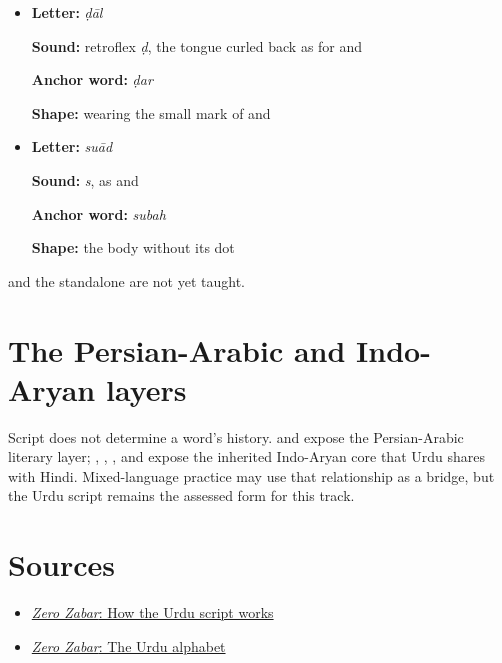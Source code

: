 \begin{itemize}
\begin{minipage}[t]{\linewidth}
  \par \textbf{Anchor word:} \textbf{} \emph{hādsā}
  \par \textbf{Shape:} \textbf{} with three dots above in place of two
  \end{minipage}
  \item \begin{minipage}[t]{\linewidth}
  \textbf{Letter:} \textbf{} \emph{ḍāl}
  \par \textbf{Sound:} retroflex \emph{ḍ}, the tongue curled back as for \textbf{} and \textbf{}
  \par \textbf{Anchor word:} \textbf{} \emph{ḍar}
  \par \textbf{Shape:} \textbf{} wearing the small mark of \textbf{} and \textbf{}
  \end{minipage}
  \item \begin{minipage}[t]{\linewidth}
  \textbf{Letter:} \textbf{} \emph{suād}
  \par \textbf{Sound:} \emph{s}, as \textbf{} and \textbf{}
  \par \textbf{Anchor word:} \textbf{} \emph{subah}
  \par \textbf{Shape:} the \textbf{} body without its dot
  \end{minipage}
\end{itemize}

 and the standalone \textbf{} are not yet taught.

\section*{The Persian-Arabic and Indo-Aryan layers}

Script does not determine a word's history. \textbf{} and \textbf{} expose the Persian-Arabic literary layer; \textbf{}, \textbf{}, \textbf{}, and \textbf{} expose the inherited Indo-Aryan core that Urdu shares with Hindi. Mixed-language practice may use that relationship as a bridge, but the Urdu script remains the assessed form for this track.

\section*{Sources}

\begin{itemize}
\raggedright
\setlength{\itemsep}{0.35em}
  \item \href{https://openbooks.library.northwestern.edu/zerozabar/front-matter/introduction/}{\emph{Zero Zabar}: How the Urdu script works}
  \item \href{https://openbooks.library.northwestern.edu/zerozabar/chapter/the-urdu-alphabet/}{\emph{Zero Zabar}: The Urdu alphabet}
\end{itemize}

